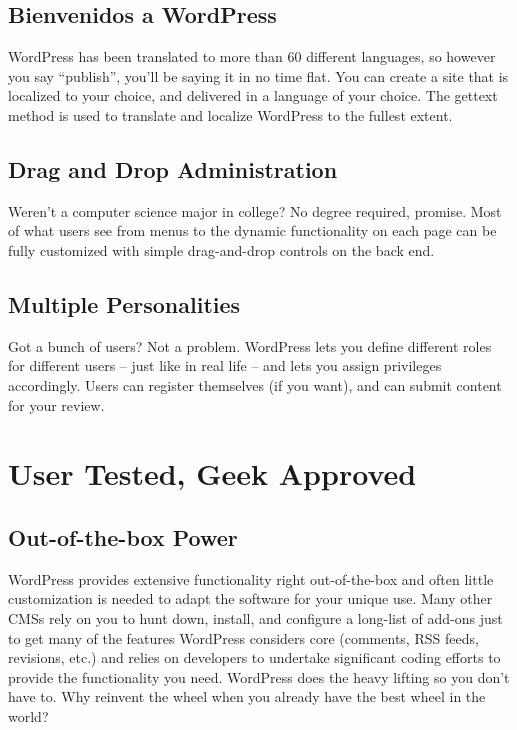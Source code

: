 \subsection{Bienvenidos a WordPress}

WordPress has been translated to more than 60 different languages, so however you say “publish”, you’ll be saying it in no time flat. You can create a site that is localized to your choice, and delivered in a language of your choice. The gettext method is used to translate and localize WordPress to the fullest extent.

\subsection{Drag and Drop Administration}

Weren’t a computer science major in college? No degree required, promise. Most of what users see from menus to the dynamic functionality on each page can be fully customized with simple drag-and-drop controls on the back end.

\subsection{Multiple Personalities}

Got a bunch of users? Not a problem. WordPress lets you define different roles for different users – just like in real life – and lets you assign privileges accordingly. Users can register themselves (if you want), and can submit content for your review.

\section{User Tested, Geek Approved}

\subsection{Out-of-the-box Power}

WordPress provides extensive functionality right out-of-the-box and often little customization is needed to adapt the software for your unique use. Many other CMSs rely on you to hunt down, install, and configure a long-list of add-ons just to get many of the features WordPress considers core (comments, RSS feeds, revisions, etc.) and relies on developers to undertake significant coding efforts to provide the functionality you need. WordPress does the heavy lifting so you don’t have to. Why reinvent the wheel when you already have the best wheel in the world?

